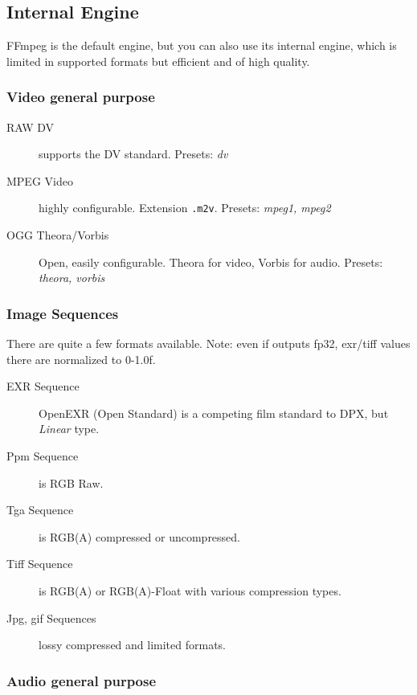 \subsection{\CGG{} Internal Engine}%
\label{sub:internal_engine}

FFmpeg is the default engine, but you can also use its internal engine, which is limited in supported formats but efficient and of high quality.

\subsubsection{Video general purpose}
\label{ssub:internal_general_purpose}

\begin{description}
	\item[RAW DV] supports the DV standard.
	\newline    Presets: \textit{dv}
	\item[MPEG Video] highly configurable. Extension \texttt{.m2v}.
	\newline    Presets: \textit{mpeg1, mpeg2}
	\item[OGG Theora/Vorbis] Open, easily configurable. Theora for video, Vorbis for audio.
	\newline    Presets: \textit{theora, vorbis}
\end{description}

\subsubsection{Image Sequences}
\label{sub:internal_image_sequences}

There are quite a few formats available. Note: even if \CGG{} outputs fp32, exr/tiff values there are normalized to 0-1.0f.

\begin{description}
	\item[EXR Sequence] OpenEXR (Open Standard) is a competing film standard to DPX, but \textit{Linear} type.
	\item[Ppm Sequence] is RGB Raw.
	\item[Tga Sequence] is RGB(A) compressed or uncompressed.
	\item[Tiff Sequence] is RGB(A) or RGB(A)-Float with various compression types.
	\item[Jpg, gif Sequences] lossy compressed and limited formats.
\end{description}

\subsubsection{Audio general purpose}
\label{sub:internal_audio_general_purpose}

